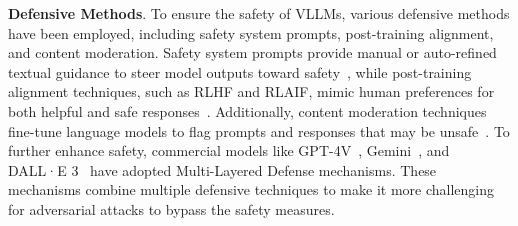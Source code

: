 \noindent \textbf{Defensive Methods}.
To ensure the safety of VLLMs, various defensive methods have been employed, including safety system prompts, post-training alignment, and content moderation. Safety system prompts provide manual or auto-refined textual guidance to steer model outputs toward safety~\cite{gong2023figstep, geminiteam2024geminifamilyhighlycapable, Jiang2024MixtralOE}, while post-training alignment techniques, such as RLHF and RLAIF, mimic human preferences for both helpful and safe responses~\citep{stiennon2020learning, ouyang2022training,bai2022constitutional}. Additionally, content moderation techniques fine-tune language models to flag prompts and responses that may be unsafe~\cite{safety_checker, ShieldGemma, llamaguard1, llamaguard2, llamaguard3, openai_moderation}.
To further enhance safety, commercial models like GPT-4V~\cite{2023GPT4VisionSC}, Gemini~\cite{geminiteam2024geminifamilyhighlycapable}, and DALL·E 3~\cite{openai2023dalle3} have adopted Multi-Layered Defense mechanisms. These mechanisms combine multiple defensive techniques to make it more challenging for adversarial attacks to bypass the safety measures.
